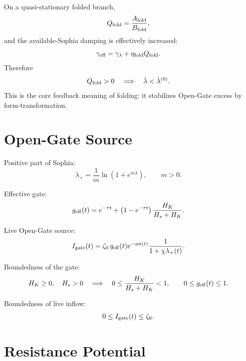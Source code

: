 \documentclass[11pt,a4paper]{article}
\newcommand{\Igate}{I_{\rm gate}}
\theoremstyle{plain}
\theoremstyle{definition}
\theoremstyle{remark}
\begin{document}
On a quasi-stationary folded branch,
\begin{equation}
  Q_{\rm fold}=\frac{A_{\rm fold}}{B_{\rm fold}},
\end{equation}
and the available-Sophia damping is effectively increased:
\begin{equation}
  \gamma_{\rm eff}=\gamma_\lambda+
  \eta_{\rm fold}Q_{\rm fold}.
\end{equation}
Therefore
\begin{equation}
  Q_{\rm fold}>0
  \quad\Longrightarrow\quad
  \dot\lambda<\dot\lambda^{(0)}.
\end{equation}
This is the core feedback meaning of folding: it stabilizes Open-Gate excess by
form-transformation.


\section{Open-Gate Source}

Positive part of Sophia:
\begin{equation}
  \lambda_+=\frac{1}{m}\ln(1+e^{m\lambda}),
  \qquad m>0.
\end{equation}

Effective gate:
\begin{equation}
  g_{\rm eff}(t)=e^{-\tau t}+\left(1-e^{-\tau t}\right)\frac{H_K}{H_s+H_K}.
\end{equation}

Live Open-Gate source:
\begin{equation}
  \Igate(t)=\zeta_0\,g_{\rm eff}(t)e^{-\phi\sigma(t)}
  \frac{1}{1+\chi\lambda_+(t)}.
\end{equation}

Boundedness of the gate:
\begin{equation}
  H_K\ge0,\quad H_s>0
  \quad\Longrightarrow\quad
  0\le \frac{H_K}{H_s+H_K}<1,
  \qquad
  0\le g_{\rm eff}(t)\le1.
\end{equation}

Boundedness of live inflow:
\begin{equation}
  0\le \Igate(t)\le \zeta_0.
\end{equation}

\section{Resistance Potential}
\end{document}
